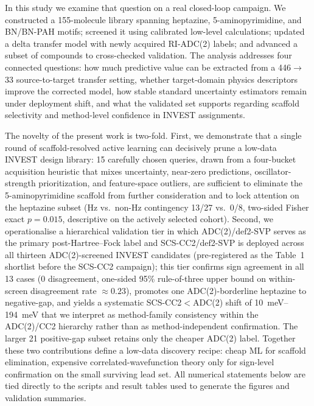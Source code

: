 \documentclass[journal=jcisd8,manuscript=article]{achemso}
\begin{document}
In this study we examine that question on a real closed-loop campaign. We constructed a 155-molecule library spanning heptazine, 5-aminopyrimidine, and BN/BN-PAH motifs; screened it using calibrated low-level calculations; updated a delta transfer model with newly acquired RI-ADC(2) labels; and advanced a subset of compounds to cross-checked validation. The analysis addresses four connected questions: how much predictive value can be extracted from a 446$\rightarrow$33 source-to-target transfer setting, whether target-domain physics descriptors improve the corrected model, how stable standard uncertainty estimators remain under deployment shift, and what the validated set supports regarding scaffold selectivity and method-level confidence in INVEST assignments.

The novelty of the present work is two-fold. First, we demonstrate that a single round of scaffold-resolved active learning can decisively prune a low-data INVEST design library: 15 carefully chosen queries, drawn from a four-bucket acquisition heuristic that mixes uncertainty, near-zero predictions, oscillator-strength prioritization, and feature-space outliers, are sufficient to eliminate the 5-aminopyrimidine scaffold from further consideration and to lock attention on the heptazine subset (Hz vs.\ non-Hz contingency 13/27 vs.\ 0/8, two-sided Fisher exact $p=0.015$, descriptive on the actively selected cohort). Second, we operationalise a hierarchical validation tier in which ADC(2)/def2-SVP serves as the primary post-Hartree--Fock label and SCS-CC2/def2-SVP is deployed across all thirteen ADC(2)-screened INVEST candidates (pre-registered as the Table~1 shortlist before the SCS-CC2 campaign); this tier confirms sign agreement in all 13 cases (0 disagreement, one-sided 95\% rule-of-three upper bound on within-screen disagreement rate $\approx 0.23$), promotes one ADC(2)-borderline heptazine to negative-gap, and yields a systematic SCS-CC2$<$ADC(2) shift of \SIrange{10}{194}{meV} that we interpret as method-family consistency within the ADC(2)/CC2 hierarchy rather than as method-independent confirmation. The larger 21 positive-gap subset retains only the cheaper ADC(2) label. Together these two contributions define a low-data discovery recipe: cheap ML for scaffold elimination, expensive correlated-wavefunction theory only for sign-level confirmation on the small surviving lead set. All numerical statements below are tied directly to the scripts and result tables used to generate the figures and validation summaries.
\end{document}
